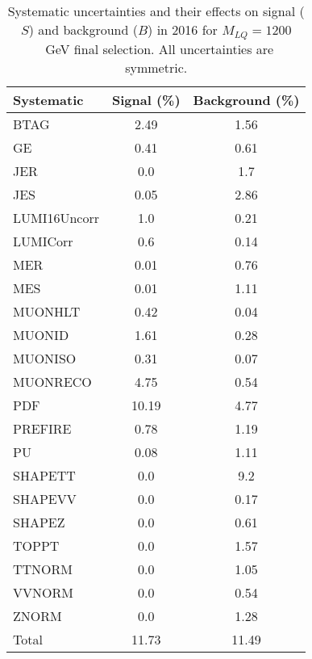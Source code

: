 \begin{table}[htbp]
\begin{center}
\caption{Systematic uncertainties and their effects on signal ($S$) and background ($B$) in 2016 for $M_{LQ}=1200$~GeV final selection. All uncertainties are symmetric.}
\begin{tabular}{lcc}
\hline\hline
Systematic & Signal (\%) & Background (\%) \\ \hline 
BTAG & 2.49 & 1.56\\ 
GE & 0.41 & 0.61\\ 
JER & 0.0 & 1.7\\ 
JES & 0.05 & 2.86\\ 
LUMI16Uncorr & 1.0 & 0.21\\ 
LUMICorr & 0.6 & 0.14\\ 
MER & 0.01 & 0.76\\ 
MES & 0.01 & 1.11\\ 
MUONHLT & 0.42 & 0.04\\ 
MUONID & 1.61 & 0.28\\ 
MUONISO & 0.31 & 0.07\\ 
MUONRECO & 4.75 & 0.54\\ 
PDF & 10.19 & 4.77\\ 
PREFIRE & 0.78 & 1.19\\ 
PU & 0.08 & 1.11\\ 
SHAPETT & 0.0 & 9.2\\ 
SHAPEVV & 0.0 & 0.17\\ 
SHAPEZ & 0.0 & 0.61\\ 
TOPPT & 0.0 & 1.57\\ 
TTNORM & 0.0 & 1.05\\ 
VVNORM & 0.0 & 0.54\\ 
ZNORM & 0.0 & 1.28\\ 
Total & 11.73 & 11.49\\ \hline \hline
\end{tabular}
\label{tab:SysUncertainties_uujj_1200}
\end{center}
\end{table}

